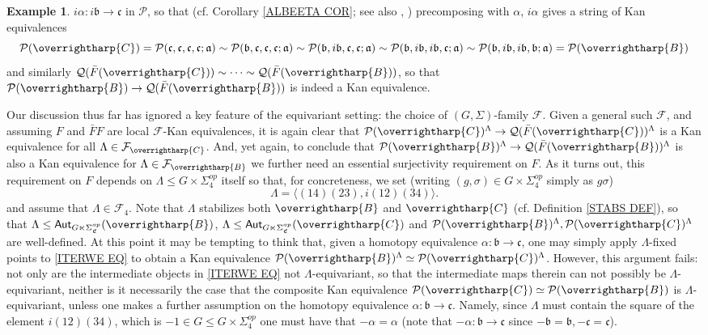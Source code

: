 \documentclass[a4paper,10pt
 ,final
]{article}%
\numberwithin{equation}{section}
\numberwithin{figure}{section}
\theoremstyle{definition} %
\newtheorem{example}[equation]{Example}%
\newcommand{\vect}[1]{\text{\overrightharp{\ensuremath{#1}}}}
\newcommand{\F}{\ensuremath{\mathcal F}}
\renewcommand{\P}{\ensuremath{\mathcal P}}
\newcommand{\1}{\ensuremath{\mathbbm 1}}%
\begin{document}
\begin{example}
$i\alpha \colon i\mathfrak{b} \to \mathfrak{c}$ in $\P$,
so that
(cf. Corollary \ref{ALBEETA COR}; 
see also \cite[Lemma 2.1]{BM13},
\cite[Lemma 4.14]{Cav})
precomposing  
with $\alpha$, $i \alpha$ gives a string of Kan equivalences
\begin{equation}\label{ITERWE EQ}
\P(\vect{C})
=
\P(\mathfrak{c},\mathfrak{c},\mathfrak{c},\mathfrak{c};\mathfrak{a})
\sim 
\P(\mathfrak{b},\mathfrak{c},\mathfrak{c},\mathfrak{c};\mathfrak{a})
\sim
\P(\mathfrak{b},i\mathfrak{b},\mathfrak{c},\mathfrak{c};\mathfrak{a})
\sim
\P(\mathfrak{b},i\mathfrak{b},i\mathfrak{b},\mathfrak{c};\mathfrak{a})
\sim
\P(\mathfrak{b},i\mathfrak{b},i\mathfrak{b},\mathfrak{b};\mathfrak{a})
=
\P(\vect{B})
\end{equation}
and similarly
$\mathcal{Q}(\bar{F}(\vect{C})) 
\sim
\cdots 
\sim
\mathcal{Q}(\bar{F}(\vect{B}))$,
so that
$\P(\vect{B}) \to \mathcal{Q}(\bar{F}(\vect{B}))$
is indeed a Kan equivalence.

Our discussion thus far has ignored a key feature of the equivariant setting: the choice of $(G,\Sigma)$-family $\F$.
Given a general such $\F$, 
and assuming $F$ and $\bar{F} F$ are local $\F$-Kan equivalences,
it is again clear that
$\P(\vect{C})^{\Lambda} \to \mathcal{Q}(\bar{F}(\vect{C}))^{\Lambda}$
is a Kan equivalence for all $\Lambda \in \F_{\vect{C}}$.
%
And, yet again, to conclude that
$\P(\vect{B})^{\Lambda} \to \mathcal{Q}(\bar{F}(\vect{B}))^{\Lambda}$
is also a Kan equivalence for $\Lambda \in \F_{\vect{B}}$ we further need an essential surjectivity requirement on $F$.
As it turns out, this requirement on $F$ depends on 
$\Lambda \leq G \times \Sigma_4^{op}$ itself so that, for concreteness, we set (writing $(g,\sigma) \in G \times \Sigma_4^{op}$ simply as $g\sigma$)
\[
\Lambda = \langle (14)(23), i (12)(34) \rangle.
\]
and assume that $\Lambda \in \F_4$.
Note that $\Lambda$ stabilizes both 
$\vect{B}$ and $\vect{C}$
(cf. Definition \ref{STABS DEF}),
so that 
$\Lambda \leq \mathsf{Aut}_{G \ltimes \Sigma^{op}_{\mathfrak{C}}}(\vect{B})$,
$\Lambda \leq \mathsf{Aut}_{G \ltimes \Sigma^{op}_{\mathfrak{C}}}(\vect{C})$
and $\P(\vect{B})^{\Lambda}, \P(\vect{C})^{\Lambda}$
are well-defined.
%
At this point it may be tempting to think that, 
given a homotopy equivalence  
$\alpha \colon \mathfrak{b} \to \mathfrak{c}$,
one may simply apply $\Lambda$-fixed points 
to \eqref{ITERWE EQ}
to obtain a Kan equivalence 
$\P(\vect{B})^{\Lambda} \simeq \P(\vect{C})^{\Lambda}$.
%
However, this argument fails: not only are the intermediate objects
in \eqref{ITERWE EQ} not $\Lambda$-equivariant, so that the intermediate maps therein can not possibly be $\Lambda$-equivariant,
neither is it necessarily the case that the composite Kan equivalence
$\P(\vect{C}) \simeq \P(\vect{B})$ is $\Lambda$-equivariant,
unless one makes a further assumption on the homotopy equivalence
$\alpha\colon \mathfrak{b} \to \mathfrak{c}$.
Namely, since $\Lambda$
must contain the square of the element $i(12)(34)$,
which is $-1 \in G \leq G \times \Sigma_4^{op}$
one must have that 
$-\alpha =\alpha$
(note that $-\alpha \colon \mathfrak{b} \to \mathfrak{c}$
since $-\mathfrak{b}=\mathfrak{b},-\mathfrak{c}=\mathfrak{c}$).


\end{example}
\end{document}
